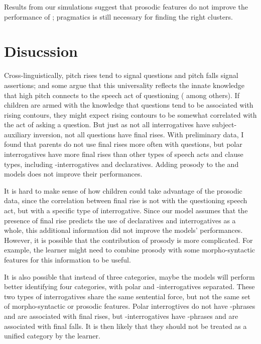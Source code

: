 Results from our simulations suggest that prosodic features do not improve the performance of \dlearnerabbr{}; pragmatics is still necessary for finding the right clusters.


\section{Disucssion}
\label{sec:prosody:discussion}
Cross-linguistically, pitch rises tend to signal questions and pitch falls signal assertions; and some argue that this universality reflects the innate knowledge that high pitch connects to the speech act of questioning (\cite{ohala1984,gussenhovenchen2000,gussenhoven2002} among others). If children are armed with the knowledge that questions tend to be associated with rising contours, they might expect rising contours to be somewhat correlated with the act of asking a question. But just as not all interrogatives have subject-auxiliary inversion, not all questions have final rises. With preliminary data, I found that parents do not use final rises more often with questions, but polar interrogatives have more final rises than other types of speech acts and clause types, including \twh-interrogatives and declaratives. Adding prosody to the \dlearnerabbr{} and \plearnerabbr{} models does not improve their performances. 


It is hard to make sense of how children could take advantage of the prosodic data, since the correlation between final rise is not with the questioning speech act, but with a specific type of interrogative. Since our model assumes that the presence of final rise predicts the use of declaratives and interrogatives as a whole, this additional information did not improve the models' performances. However, it is possible that the contribution of prosody is more complicated. For example, the learner might need to combine prosody with some morpho-syntactic features for this information to be useful.  

It is also possible that instead of three categories, maybe the models will perform better identifying four categories, with polar and \twh-interrogatives separated. These two types of interrogatives share the same sentential force, but not the same set of morpho-syntactic or prosodic features. Polar interrogtives do not have \twh-phrases and are associated with final rises, but \twh-interrogatives have \twh-phrases and are associated with final falls. It is then likely that they should not be treated as a unified category by the learner.

